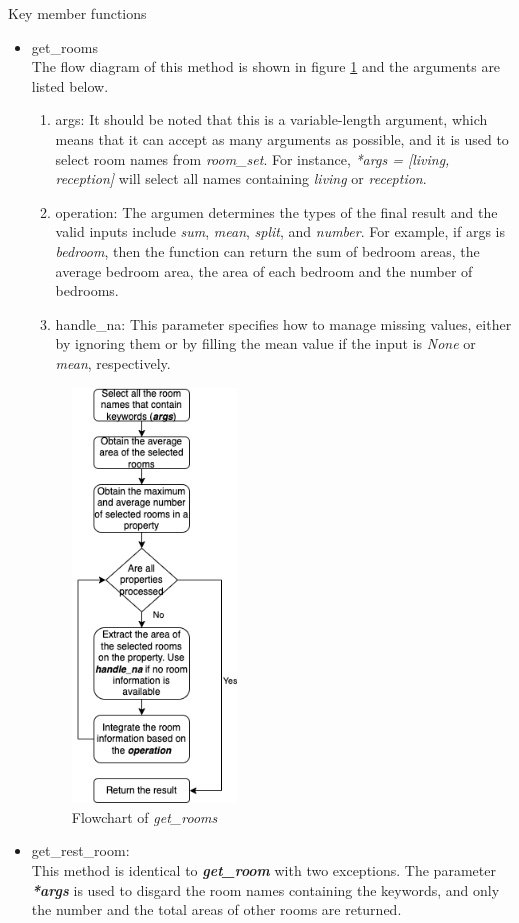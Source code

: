 \documentclass[12pt,twoside]{report}
\begin{document}
Key member functions
\begin{itemize}
	\item get\_rooms \\
	The flow diagram of this method is shown in figure \ref{extract_room_get_rooms} and the arguments are listed below.
	\begin{enumerate}
		\item args: It should be noted that this is a variable-length argument, which means that it can accept as many arguments as possible, and it is used to select room names from \textit{room\_set}. For instance, \textit{*args = [living, reception]} will select all names containing \textit{living} or \textit{reception}. 
		\item operation: The argumen determines the types of the final result and the valid inputs include \textit{sum}, \textit{mean}, \textit{split}, and \textit{number}. For example, if args is \textit{bedroom}, then the function can return the sum of bedroom areas, the average bedroom area, the area of each bedroom and the number of bedrooms. 
		\item handle\_na: This parameter specifies how to manage missing values, either by ignoring them or by filling the mean value if the input is \textit{None} or \textit{mean}, respectively. 
	\end{enumerate} 
	\begin{figure}[!htbp]
		\centering
		\includegraphics[height=11cm]{extract_room_get_rooms}
		\caption{Flowchart of \textit{get\_rooms}}
		\label{extract_room_get_rooms}
	\end{figure}
	\item get\_rest\_room: \\
	This method is identical to \textit{\textbf{get\_room}} with two exceptions. The parameter \textit{\textbf{*args}} is used to disgard the room names containing the keywords, and only the number and the total areas of other rooms are returned. 
\end{itemize}
\end{document}
